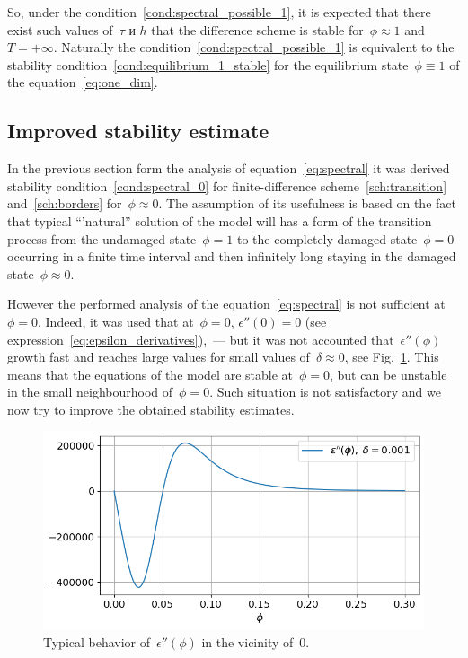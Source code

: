 So, under the condition~\eqref{cond:spectral_possible_1}, it is expected that
there exist such values of~$\tau$ и $h$
that the difference scheme is stable for~$\phi \approx 1$
and~$T=+\infty$.
Naturally the condition~\eqref{cond:spectral_possible_1}
is equivalent to the stability condition~\eqref{cond:equilibrium_1_stable}
for the equilibrium state~$\phi \equiv 1$ of the equation~\eqref{eq:one_dim}.

\subsection{Improved stability estimate}

In the previous section form the analysis of equation~\eqref{eq:spectral}
it was derived stability condition~\eqref{cond:spectral_0}
for finite-difference scheme~\eqref{sch:transition} and~\eqref{sch:borders} for~$\phi \approx 0$.
The assumption of its usefulness is based on the fact that typical ``'natural'' solution of the model
will has a form of the transition process from the undamaged state~$\phi=1$ to the completely
damaged state~$\phi=0$ occurring in a finite time interval and then infinitely long staying in the
damaged state~$\phi \approx 0$.


However the performed analysis of the equation~\eqref{eq:spectral}
is not sufficient at~$\phi = 0$. Indeed, it was used that at~$\phi=0$,
$\epsilon''(0) = 0$ (see expression~\eqref{eq:epsilon_derivatives}),~---
but it was not accounted that~$\epsilon''(\phi)$ growth fast and reaches
large values  for small values of~$\delta\approx 0$,
see Fig.~\ref{fig:eps_phi_phi}.
This means that the equations of the model are stable at~$\phi=0$,
but can be unstable in the small neighbourhood of~$\phi=0$.
Such situation is not satisfactory and we now try to improve
the obtained stability estimates.
%
\begin{figure}[!t]
	\centering
	\includegraphics[width=\textwidth]{figures/eps_phi_phi.png}
	\vspace{-0.7cm}
	\caption{Typical behavior of~$\epsilon''(\phi)$ in the vicinity of~$0$.}
	\label{fig:eps_phi_phi}
\end{figure}

